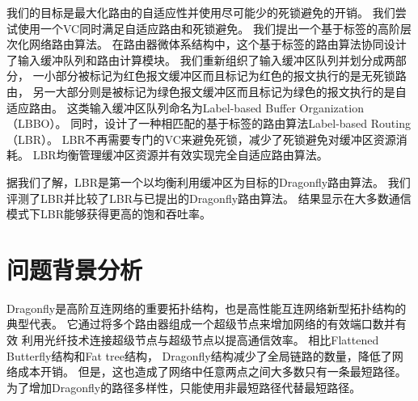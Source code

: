 我们的目标是最大化路由的自适应性并使用尽可能少的死锁避免的开销。
我们尝试使用一个VC同时满足自适应路由和死锁避免。
我们提出一个基于标签的高阶层次化网络路由算法。
在路由器微体系结构中，这个基于标签的路由算法协同设计了输入缓冲队列和路由计算模块。
我们重新组织了输入缓冲区队列并划分成两部分，
一小部分被标记为红色报文缓冲区而且标记为红色的报文执行的是无死锁路由，
另一大部分则是被标记为绿色报文缓冲区而且标记为绿色的报文执行的是自适应路由。
这类输入缓冲区队列命名为Label-based Buffer Organization（LBBO）。
同时，设计了一种相匹配的基于标签的路由算法Label-based Routing（LBR）。
LBR不再需要专门的VC来避免死锁，减少了死锁避免对缓冲区资源消耗。
LBR均衡管理缓冲区资源并有效实现完全自适应路由算法。

据我们了解，LBR是第一个以均衡利用缓冲区为目标的Dragonfly路由算法。
我们评测了LBR并比较了LBR与已提出的Dragonfly路由算法。
结果显示在大多数通信模式下LBR能够获得更高的饱和吞吐率。

\section{问题背景分析}

Dragonfly是高阶互连网络的重要拓扑结构，也是高性能互连网络新型拓扑结构的典型代表。
它通过将多个路由器组成一个超级节点来增加网络的有效端口数并有效
利用光纤技术连接超级节点与超级节点以提高通信效率。
相比Flattened Butterfly结构和Fat tree结构，
Dragonfly结构减少了全局链路的数量，降低了网络成本开销。
但是，这也造成了网络中任意两点之间大多数只有一条最短路径。
为了增加Dragonfly的路径多样性，只能使用非最短路径代替最短路径。

